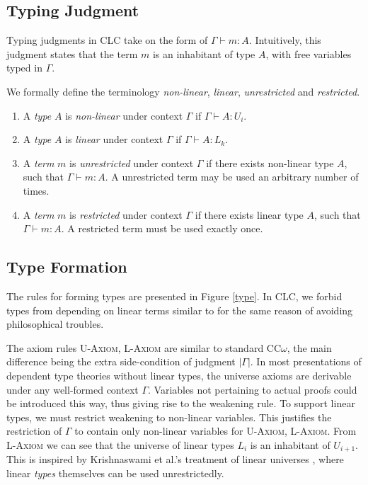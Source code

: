 \documentclass[sigplan,screen,review,anonymous]{acmart}
\newcommand{\rname}[1]{\textsc{\footnotesize #1}}
\newcommand{\pure}[1]{|#1|}
\begin{document}
\subsection{Typing Judgment}
Typing judgments in CLC take on the form of $\Gamma \vdash m : A$. Intuitively, this judgment states that the term $m$ is an inhabitant of type $A$, with free variables typed in $\Gamma$.

\begin{definition} We formally define the terminology \textit{non-linear}, \textit{linear}, \textit{unrestricted} and \textit{restricted}.
  \begin{enumerate}
    \item A \textit{type} $A$ is \textit{non-linear} under context $\Gamma$ if $\Gamma \vdash A : U_i$.
    \item A \textit{type} $A$ is \textit{linear} under context $\Gamma$ if $\Gamma \vdash A : L_k$.
    \item A \textit{term} $m$ is \textit{unrestricted} under context $\Gamma$ if there exists non-linear type $A$, such that $\Gamma \vdash m : A$. A unrestricted term may be used an arbitrary number of times.
    \item A \textit{term} $m$ is \textit{restricted} under context $\Gamma$ if there exists linear type $A$, such that $\Gamma \vdash m : A$. A restricted term must be used exactly once.
  \end{enumerate}
\end{definition}

\subsection{Type Formation} \label{tyformation}
The rules for forming types are presented in Figure \ref{type}. In CLC, we forbid types from depending on linear terms similar to \cite{llf,neel15} for the same reason of avoiding philosophical troubles.

The axiom rules \rname{U-Axiom}, \rname{L-Axiom} are similar to standard CC$\omega$, the main difference being the extra side-condition of judgment $\pure{\Gamma}$. In most presentations of dependent type theories without linear types, the universe axioms are derivable under any well-formed context $\Gamma$. Variables not pertaining to actual proofs could be introduced this way, thus giving rise to the weakening rule. To support linear types, we must restrict weakening to non-linear variables. This justifies the restriction of $\Gamma$ to contain only non-linear variables for \rname{U-Axiom}, \rname{L-Axiom}. From \rname{L-Axiom} we can see that the universe of linear types $L_i$ is an inhabitant of $U_{i+1}$. This is inspired by Krishnaswami et al.'s treatment of linear universes \cite{neel15}, where linear \textit{types} themselves can be used unrestrictedly.
\end{document}
